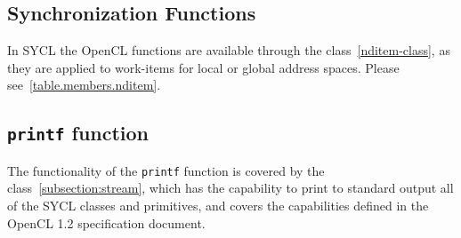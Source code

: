 \subsection{Synchronization Functions}

In SYCL the OpenCL  functions are available through the
 class~\ref{nditem-class}, as they are applied to work-items for local
or global address spaces. Please see~\ref{table.members.nditem}.

\subsection{\texttt{printf} function}

The functionality of the \texttt{printf} function is covered by the
 class~\ref{subsection:stream}, which has the
capability to print to standard output all of the SYCL classes and primitives,
and covers the capabilities defined in the OpenCL 1.2 specification
document\cite[par. 6.12.13]{opencl12}.


